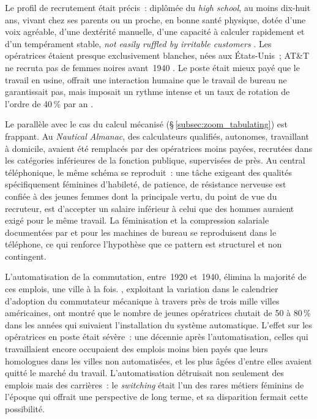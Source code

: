 Le profil de recrutement était précis~: diplômée du \emph{high school}, au moins dix-huit ans, vivant chez ses parents ou un proche, en bonne santé physique, dotée d'une voix agréable, d'une dextérité manuelle, d'une capacité à calculer rapidement et d'un tempérament stable, \og \emph{not easily ruffled by irritable customers}\fg{} \parencite{erickson_telephone_1946}. Les opératrices étaient presque exclusivement blanches, nées aux États-Unis~; AT\&T ne recruta pas de femmes noires avant~1940 \parencite{green_race_2001}. Le poste était mieux payé que le travail en usine, offrait une interaction humaine que le travail de bureau ne garantissait pas, mais imposait un rythme intense et un taux de rotation de l'ordre de 40\,\% par an \parencite{feigenbaum_answering_2024}.

Le parallèle avec le cas du calcul mécanisé (§\,\ref{subsec:zoom_tabulating}) est frappant. Au \emph{Nautical Almanac}, des calculateurs qualifiés, autonomes, travaillant à domicile, avaient été remplacés par des opératrices moins payées, recrutées dans les catégories inférieures de la fonction publique, supervisées de près. Au central téléphonique, le même schéma se reproduit~: une tâche exigeant des qualités \og spécifiquement féminines d'habileté, de patience, de résistance nerveuse\fg{} \parencite{bertho_histoire_1984} est confiée à des jeunes femmes dont la principale vertu, du point de vue du recruteur, est d'accepter un salaire inférieur à celui que des hommes auraient exigé pour le même travail. La féminisation et la compression salariale documentées par \textcite{davies_womans_1982} et \textcite{strom_beyond_1992} pour les machines de bureau se reproduisent dans le téléphone, ce qui renforce l'hypothèse que ce pattern est structurel et non contingent.

%
L'automatisation de la commutation, entre~1920 et~1940, élimina la majorité de ces emplois, une ville à la fois. \textcite{feigenbaum_answering_2024}, exploitant la variation dans le calendrier d'adoption du commutateur mécanique à travers près de trois mille villes américaines, ont montré que le nombre de jeunes opératrices chutait de 50 à 80\,\% dans les années qui suivaient l'installation du système automatique. L'effet sur les opératrices en poste était sévère~: une décennie après l'automatisation, celles qui travaillaient encore occupaient des emplois moins bien payés que leurs homologues dans les villes non automatisées, et les plus âgées d'entre elles avaient quitté le marché du travail. L'automatisation détruisait non seulement des emplois mais des carrières~: le \emph{switching} était l'un des rares métiers féminins de l'époque qui offrait une perspective de long terme, et sa disparition fermait cette possibilité.

